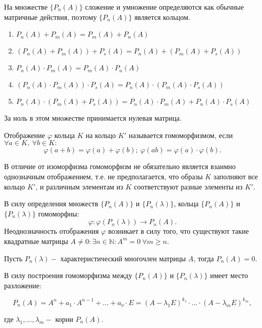 На множестве $\{P_n(A)\}$ сложение и умножение определяются как обычные матричные действия, поэтому $\{P_n(A)\}$ является кольцом.

\begin{enumerate}
	\item $P_n(A) + P_m(A) = P_m(A) + P_n(A)$
	\item $(P_n(A) + P_m(A)) + P_s(A) = P_n(A) + (P_m(A) + P_s(A))$
	\item $P_n(A) \cdot P_m(A) = P_m(A) \cdot P_n(A)$
	\item $(P_n(A) \cdot P_m(A)) \cdot P_s(A) = P_n(A) \cdot (P_m(A) \cdot P_s(A))$
	\item $P_n(A) \cdot (P_m(A) + P_s(A)) = P_n(A) \cdot P_m(A) + P_n(A) \cdot P_s(A)$
\end{enumerate}

За ноль в этом множестве принимается нулевая матрица.

\begin{definition}
	Отображение $\varphi$ кольца $K$ на кольцо $K'$ называется гомоморфизмом, если $\forall a \in K,~ \forall b \in K:$
	\[\varphi(a+b) = \varphi(a) + \varphi(b);~ \varphi(ab) = \varphi(a) \cdot \varphi(b).\] 
\end{definition}

В отличие от изоморфизма гомоморфизм не обязательно является взаимно однозначным отображением, т.е. не предполагается, что образы $K$ заполняют все кольцо $K'$, и различным элементам из $K$ соответствуют разные элементы из $K'$.

В силу определения множеств $\{P_n(A)\}$ и $\{P_n(\lambda)\}$, кольца $\{P_n(A)\}$ и $\{P_n(\lambda)\}$ гомоморфны:
\[\varphi: \varphi(P_n(\lambda)) \longrightarrow P_n(A).\]
Неоднозначность отображения $\varphi$ возникает в силу того, что существуют такие квадратные матрицы $A \neq 0: \exists n \in \mathbb {N}: A^m = 0~ \forall m \geqslant n$.

\begin{theorem}
	Пусть $P_n(\lambda) - $ характеристический многочлен матрицы $A$, тогда $P_n(A) = 0$.
\end{theorem}

В силу построения гомоморфизма между $\{P_n(A)\}$ и $\{P_n(\lambda)\}$ имеет место разложение:

\[P_n(A) = A^n + a_1 \cdot A^{n-1} + ... + a_o \cdot E = (A - \lambda_1 E)^{k_1} \cdot ... \cdot (A - \lambda_m E)^{k_m},\]

где $\lambda_1, ..., \lambda_m - $ корни $P_n(A)$.

